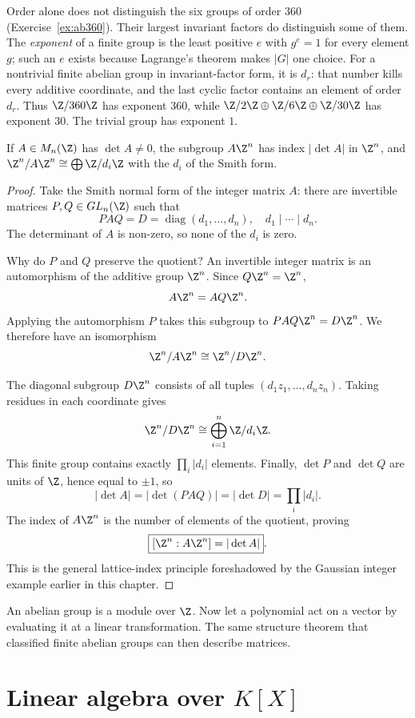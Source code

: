 Order alone does not distinguish the six groups of order $360$
(Exercise~\ref{ex:ab360}). Their largest invariant factors do distinguish
some of them. The \emph{exponent} of a finite group is the least positive
$e$ with $g^e=1$ for every element $g$; such an $e$ exists because
Lagrange's theorem makes $|G|$ one choice. For a nontrivial finite
abelian group in invariant-factor form, it is $d_r$: that number kills every additive
coordinate, and the last cyclic factor contains an element of order
$d_r$. Thus $\Z/360\Z$ has exponent $360$, while
$\Z/2\Z\oplus\Z/6\Z\oplus\Z/30\Z$ has exponent $30$.
The trivial group has exponent $1$.

\begin{corollary}\label{cor:index}
If $A\in M_n(\Z)$ has $\det A\ne0$, the subgroup $A\Z^n$ has index $|\det A|$ in $\Z^n$, and $\Z^n/A\Z^n\cong\bigoplus\Z/d_i\Z$ with the $d_i$ of the Smith form.
\end{corollary}
\begin{proof}
Take the Smith normal form of the integer
matrix $A$: there are invertible matrices
$P,Q\in GL_n(\Z)$ such that
\[
PAQ=D=\operatorname{diag}(d_1,\ldots,d_n),
\quad d_1\mid\cdots\mid d_n.
\]
The determinant of $A$ is non-zero,
so none of the $d_i$ is zero.

Why do $P$ and $Q$ preserve the quotient?
An invertible integer matrix is an
automorphism of the additive group
$\Z^n$. Since $Q\Z^n=\Z^n$,
\[
A\Z^n=AQ\Z^n.
\]
Applying the automorphism $P$ takes
this subgroup to $PAQ\Z^n=D\Z^n$.
We therefore have an isomorphism
\[
\Z^n/A\Z^n\cong\Z^n/D\Z^n.
\]

The diagonal subgroup $D\Z^n$
consists of all tuples
$(d_1z_1,\ldots,d_nz_n)$.
Taking residues in each coordinate gives
\[
\Z^n/D\Z^n\cong
\bigoplus_{i=1}^n\Z/d_i\Z.
\]
This finite group contains exactly
$\prod_i|d_i|$ elements. Finally,
$\det P$ and $\det Q$ are units
of $\Z$, hence equal to $\pm1$, so
\[
|\det A|=|\det(PAQ)|
=|\det D|=\prod_i|d_i|.
\]
The index of $A\Z^n$ is the number
of elements of the quotient, proving
\[
\boxed{[\Z^n:A\Z^n]=|\det A|}.
\]
This is the general lattice-index
principle foreshadowed by the Gaussian
integer example earlier in this chapter.
\end{proof}

An abelian group is a module over $\Z$. Now let a polynomial act on a vector by evaluating it at a linear transformation. The same structure theorem that classified finite abelian groups can then describe matrices.

\section{Linear algebra over \texorpdfstring{$K[X]$}{K[X]}}

